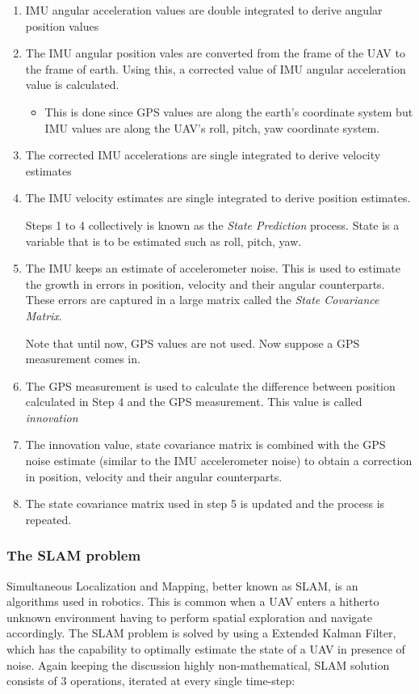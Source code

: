 \begin{enumerate}
    \item IMU angular acceleration values are double integrated to derive angular position values
    \item The IMU angular position vales are converted from the frame of the UAV to the frame of earth. Using this, a corrected value of IMU angular acceleration value is calculated.
        \begin{itemize}
            \item This is done since GPS values are along the earth's coordinate system but IMU values are along the UAV's roll, pitch, yaw coordinate system. 
        \end{itemize}
        
    \item The corrected IMU accelerations are single integrated to derive velocity estimates
    \item The IMU velocity estimates are single integrated to derive position estimates.

\noindent Steps 1 to 4 collectively is known as the  \textit{State Prediction} process. State is a variable that is to be estimated such as roll, pitch, yaw.
    
    \item The IMU keeps an estimate of accelerometer noise. This is used to estimate the growth in errors in position, velocity and their angular counterparts. These errors are captured in a large matrix called the \textit{State Covariance Matrix}.
    
\noindent Note that until now, GPS values are not used. Now suppose a GPS measurement comes in.

    \item The GPS measurement is used to calculate the difference between position calculated in Step 4 and the GPS measurement. This value is called \textit{innovation}
    
    \item The innovation value, state covariance matrix is combined with the GPS noise estimate (similar to the IMU accelerometer noise) to obtain a correction in position, velocity and their angular counterparts.
    
    \item The state covariance matrix used in step 5 is updated and the process is repeated.

\end{enumerate}
 
\subsubsection{The SLAM problem} Simultaneous Localization and Mapping, better known as SLAM, is an algorithms used in robotics. This is common when a UAV enters a hitherto unknown environment having  to perform spatial exploration and navigate accordingly. The SLAM problem is solved by using a Extended Kalman Filter, which has the capability to optimally estimate the state of a UAV in presence of noise. Again keeping the discussion highly non-mathematical, SLAM solution consists of 3 operations, iterated at every single time-step: \cite{bailey2006consistency}

